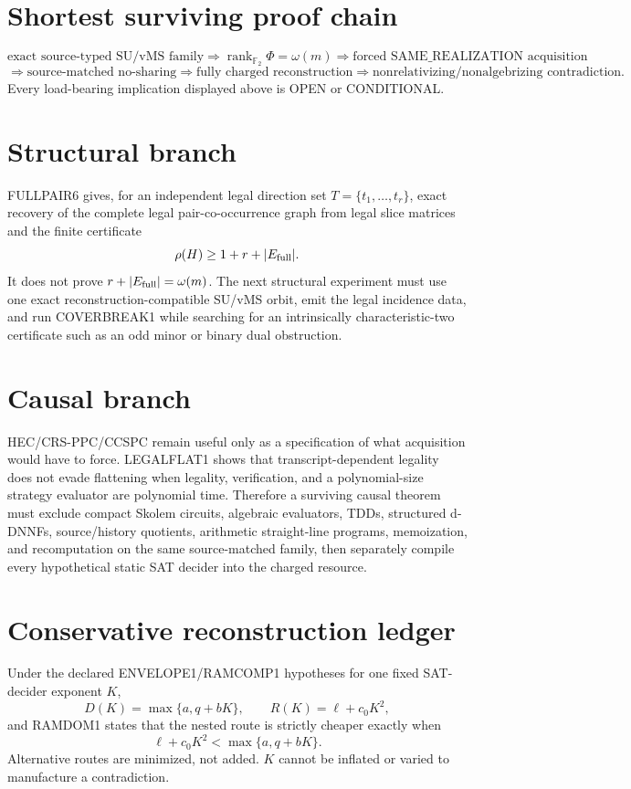 \documentclass[11pt]{article}
\begin{document}
\section*{Shortest surviving proof chain}
\[
\text{exact source-typed SU/vMS family}
\Longrightarrow
\operatorname{rank}_{\mathbb F_2}\Phi=\omega(m)
\Longrightarrow
\text{forced SAME\_REALIZATION acquisition}
\]
\[
\Longrightarrow
\text{source-matched no-sharing}
\Longrightarrow
\text{fully charged reconstruction}
\Longrightarrow
\text{nonrelativizing/nonalgebrizing contradiction}.
\]
Every load-bearing implication displayed above is OPEN or CONDITIONAL.

\section*{Structural branch}
FULLPAIR6 gives, for an independent legal direction set \(T=\{t_1,\ldots,t_r\}\), exact recovery of the complete legal pair-co-occurrence graph from legal slice matrices and the finite certificate
\[
\rho(H)\ge 1+r+|E_{\rm full}|.
\]
It does not prove \(r+|E_{\rm full}|=\omega(m)\). The next structural experiment must use one exact reconstruction-compatible SU/vMS orbit, emit the legal incidence data, and run COVERBREAK1 while searching for an intrinsically characteristic-two certificate such as an odd minor or binary dual obstruction.

\section*{Causal branch}
HEC/CRS-PPC/CCSPC remain useful only as a specification of what acquisition would have to force. LEGALFLAT1 shows that transcript-dependent legality does not evade flattening when legality, verification, and a polynomial-size strategy evaluator are polynomial time. Therefore a surviving causal theorem must exclude compact Skolem circuits, algebraic evaluators, TDDs, structured d-DNNFs, source/history quotients, arithmetic straight-line programs, memoization, and recomputation on the same source-matched family, then separately compile every hypothetical static SAT decider into the charged resource.

\section*{Conservative reconstruction ledger}
Under the declared ENVELOPE1/RAMCOMP1 hypotheses for one fixed SAT-decider exponent \(K\),
\[
D(K)=\max\{a,q+bK\},\qquad R(K)=\ell+c_0K^2,
\]
and RAMDOM1 states that the nested route is strictly cheaper exactly when
\[
\ell+c_0K^2<\max\{a,q+bK\}.
\]
Alternative routes are minimized, not added. \(K\) cannot be inflated or varied to manufacture a contradiction.
\end{document}
